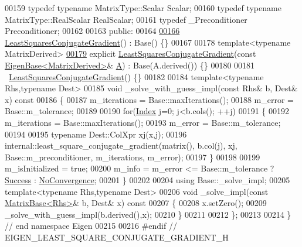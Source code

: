 \begin{DoxyCode}
00159   \textcolor{keyword}{typedef} \textcolor{keyword}{typename} MatrixType::Scalar Scalar;
00160   \textcolor{keyword}{typedef} \textcolor{keyword}{typename} MatrixType::RealScalar RealScalar;
00161   \textcolor{keyword}{typedef} \_Preconditioner Preconditioner;
00162 
00163 \textcolor{keyword}{public}:
00164 
\hyperlink{group___iterative_linear_solvers___module_ace69f423fcc1f8960d0e2de0667447c9}{00166}   \hyperlink{group___iterative_linear_solvers___module_ace69f423fcc1f8960d0e2de0667447c9}{LeastSquaresConjugateGradient}() : Base() \{\}
00167 
00178   \textcolor{keyword}{template}<\textcolor{keyword}{typename} MatrixDerived>
\hyperlink{group___iterative_linear_solvers___module_a91c4f2edc20f93cee9b721165937fb99}{00179}   \textcolor{keyword}{explicit} \hyperlink{group___iterative_linear_solvers___module_a91c4f2edc20f93cee9b721165937fb99}{LeastSquaresConjugateGradient}(\textcolor{keyword}{const} 
      \hyperlink{group___core___module_struct_eigen_1_1_eigen_base}{EigenBase<MatrixDerived>}& \hyperlink{group___core___module_class_eigen_1_1_matrix}{A}) : Base(A.derived()) \{\}
00180 
00181   ~\hyperlink{group___iterative_linear_solvers___module_class_eigen_1_1_least_squares_conjugate_gradient}{LeastSquaresConjugateGradient}() \{\}
00182 
00184   \textcolor{keyword}{template}<\textcolor{keyword}{typename} Rhs,\textcolor{keyword}{typename} Dest>
00185   \textcolor{keywordtype}{void} \_solve\_with\_guess\_impl(\textcolor{keyword}{const} Rhs& b, Dest& x)\textcolor{keyword}{ const}
00186 \textcolor{keyword}{  }\{
00187     m\_iterations = Base::maxIterations();
00188     m\_error = Base::m\_tolerance;
00189 
00190     \textcolor{keywordflow}{for}(\hyperlink{namespace_eigen_a62e77e0933482dafde8fe197d9a2cfde}{Index} j=0; j<b.cols(); ++j)
00191     \{
00192       m\_iterations = Base::maxIterations();
00193       m\_error = Base::m\_tolerance;
00194 
00195       \textcolor{keyword}{typename} Dest::ColXpr xj(x,j);
00196       internal::least\_square\_conjugate\_gradient(matrix(), b.col(j), xj, Base::m\_preconditioner, 
      m\_iterations, m\_error);
00197     \}
00198 
00199     m\_isInitialized = \textcolor{keyword}{true};
00200     m\_info = m\_error <= Base::m\_tolerance ? \hyperlink{group__enums_gga85fad7b87587764e5cf6b513a9e0ee5ea52581b035f4b59c203b8ff999ef5fcea}{Success} : \hyperlink{group__enums_gga85fad7b87587764e5cf6b513a9e0ee5eaba1c8763d1179778070f365ecc4157a8}{NoConvergence};
00201   \}
00202   
00204   \textcolor{keyword}{using} Base::\_solve\_impl;
00205   \textcolor{keyword}{template}<\textcolor{keyword}{typename} Rhs,\textcolor{keyword}{typename} Dest>
00206   \textcolor{keywordtype}{void} \_solve\_impl(\textcolor{keyword}{const} \hyperlink{group___core___module_class_eigen_1_1_matrix_base}{MatrixBase<Rhs>}& b, Dest& x)\textcolor{keyword}{ const}
00207 \textcolor{keyword}{  }\{
00208     x.setZero();
00209     \_solve\_with\_guess\_impl(b.derived(),x);
00210   \}
00211 
00212 \};
00213 
00214 \} \textcolor{comment}{// end namespace Eigen}
00215 
00216 \textcolor{preprocessor}{#endif // EIGEN\_LEAST\_SQUARE\_CONJUGATE\_GRADIENT\_H}
\end{DoxyCode}
